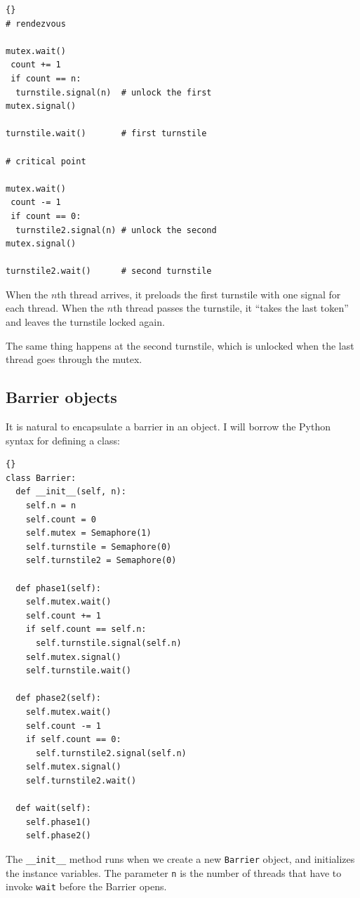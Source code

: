 \documentclass{book}
\begin{document}
\begin{lstlisting}[title={Reusable barrier solution}]{}
# rendezvous

mutex.wait()
 count += 1
 if count == n:
  turnstile.signal(n)  # unlock the first
mutex.signal()

turnstile.wait()       # first turnstile

# critical point

mutex.wait()
 count -= 1
 if count == 0:
  turnstile2.signal(n) # unlock the second
mutex.signal()

turnstile2.wait()      # second turnstile
\end{lstlisting}

When the $n$th thread arrives, it preloads the first turnstile with
one signal for each thread.  When the $n$th thread passes the
turnstile, it ``takes the last token'' and leaves the turnstile locked
again.

The same thing happens at the second turnstile, which is
unlocked when the last thread goes through the mutex.


\newpage
\subsection {Barrier objects}

It is natural to encapsulate a barrier in an object.  I will
borrow the Python syntax for defining a class:

\begin{lstlisting}[title={Barrier class}]{}
class Barrier:
  def __init__(self, n):
    self.n = n
    self.count = 0
    self.mutex = Semaphore(1)
    self.turnstile = Semaphore(0)
    self.turnstile2 = Semaphore(0)

  def phase1(self):
    self.mutex.wait()
    self.count += 1
    if self.count == self.n:
      self.turnstile.signal(self.n) 
    self.mutex.signal()
    self.turnstile.wait()            

  def phase2(self):
    self.mutex.wait()
    self.count -= 1
    if self.count == 0:
      self.turnstile2.signal(self.n)
    self.mutex.signal()
    self.turnstile2.wait()

  def wait(self):
    self.phase1()
    self.phase2()
\end{lstlisting}

The {\tt \_\_init\_\_} method runs when we create a new
    {\tt Barrier} object, and initializes the instance variables.
The parameter {\tt n} is the number of threads that have
to invoke {\tt wait} before the Barrier opens.
\end{document}
